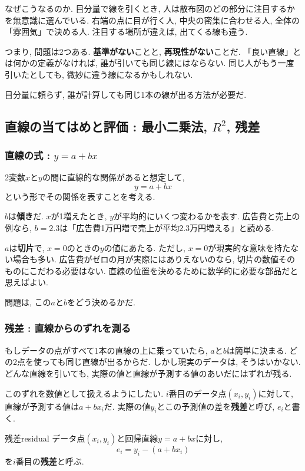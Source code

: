 なぜこうなるのか.
目分量で線を引くとき, 人は散布図のどの部分に注目するかを無意識に選んでいる.
右端の点に目が行く人, 中央の密集に合わせる人, 全体の「雰囲気」で決める人.
注目する場所が違えば, 出てくる線も違う.

つまり, 問題は2つある.
\textbf{基準がない}ことと, \textbf{再現性がない}ことだ.
「良い直線」とは何かの定義がなければ, 誰が引いても同じ線にはならない.
同じ人がもう一度引いたとしても, 微妙に違う線になるかもしれない.

目分量に頼らず, 誰が計算しても同じ1本の線が出る方法が必要だ.


\subsection{直線の当てはめと評価 : 最小二乗法, $R^2$, 残差}

\subsubsection*{直線の式 : $y = a + bx$}

2変数$x$と$y$の間に直線的な関係があると想定して,
\[
  y = a + bx
\]
という形でその関係を表すことを考える.

$b$は\textbf{傾き}だ.
$x$が1増えたとき, $y$が平均的にいくつ変わるかを表す.
広告費と売上の例なら, $b = 2.3$は「広告費1万円増で売上が平均2.3万円増える」と読める.

$a$は\textbf{切片}で, $x = 0$のときの$y$の値にあたる.
ただし, $x = 0$が現実的な意味を持たない場合も多い.
広告費がゼロの月が実際にはありえないのなら, 切片の数値そのものにこだわる必要はない.
直線の位置を決めるために数学的に必要な部品だと思えばよい.

問題は, この$a$と$b$をどう決めるかだ.

\subsubsection*{残差 : 直線からのずれを測る}

もしデータの点がすべて1本の直線の上に乗っていたら, $a$と$b$は簡単に決まる.
どの2点を使っても同じ直線が出るからだ.
しかし現実のデータは, そうはいかない.
どんな直線を引いても, 実際の値と直線が予測する値のあいだにはずれが残る.

このずれを数値として扱えるようにしたい.
$i$番目のデータ点$(x_i, y_i)$に対して, 直線が予測する値は$a + bx_i$だ.
実際の値$y_i$とこの予測値の差を\textbf{残差}と呼び, $e_i$と書く.

\begin{defi}{残差}{residual}
データ点$(x_i, y_i)$と回帰直線$y = a + bx$に対し,
\[
  e_i = y_i - (a + bx_i)
\]
を$i$番目の\textbf{残差}と呼ぶ.
\end{defi}

